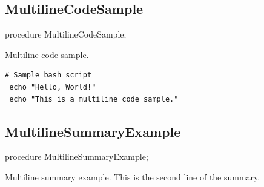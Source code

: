 \documentclass{report}
\begin{document}
\subsection*{MultilineCodeSample}
\begin{list}{}{
\setlength{\itemindent}{0cm}
\setlength{\listparindent}{0cm}
\setlength{\leftmargin}{\evensidemargin}
\addtolength{\leftmargin}{\tmplength}
\settowidth{\labelsep}{X}
\addtolength{\leftmargin}{\labelsep}
\setlength{\labelwidth}{\tmplength}
}
\begin{flushleft}
\item[\textbf{Declaration}\hfill]
\begin{ttfamily}
procedure MultilineCodeSample;\end{ttfamily}


\end{flushleft}
\par
\item[\textbf{Description}]
Multiline code sample.\hfill\vspace*{1ex}

 \begin{verbatim}# Sample bash script
 echo "Hello, World!"
 echo "This is a multiline code sample."\end{verbatim}

\end{list}
\subsection*{MultilineSummaryExample}
\begin{list}{}{
\setlength{\itemindent}{0cm}
\setlength{\listparindent}{0cm}
\setlength{\leftmargin}{\evensidemargin}
\addtolength{\leftmargin}{\tmplength}
\settowidth{\labelsep}{X}
\addtolength{\leftmargin}{\labelsep}
\setlength{\labelwidth}{\tmplength}
}
\begin{flushleft}
\item[\textbf{Declaration}\hfill]
\begin{ttfamily}
procedure MultilineSummaryExample;\end{ttfamily}


\end{flushleft}
\par
\item[\textbf{Description}]
 Multiline summary example. This is the second line of the summary. 

\end{list}
\end{document}
